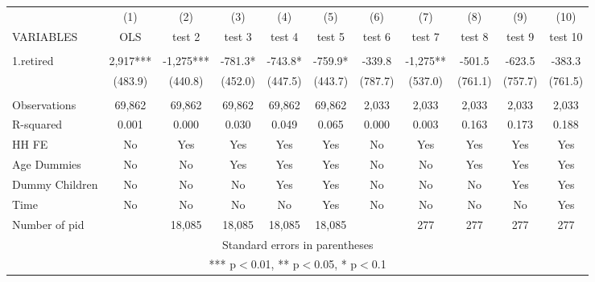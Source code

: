 \begin{tabular}{lcccccccccc} \hline
 & (1) & (2) & (3) & (4) & (5) & (6) & (7) & (8) & (9) & (10) \\
VARIABLES & OLS & test 2 & test 3 & test 4 & test 5 & test 6 & test 7 & test 8 & test 9 & test 10 \\ \hline
 &  &  &  &  &  &  &  &  &  &  \\
1.retired & 2,917*** & -1,275*** & -781.3* & -743.8* & -759.9* & -339.8 & -1,275** & -501.5 & -623.5 & -383.3 \\
 & (483.9) & (440.8) & (452.0) & (447.5) & (443.7) & (787.7) & (537.0) & (761.1) & (757.7) & (761.5) \\
 &  &  &  &  &  &  &  &  &  &  \\
Observations & 69,862 & 69,862 & 69,862 & 69,862 & 69,862 & 2,033 & 2,033 & 2,033 & 2,033 & 2,033 \\
R-squared & 0.001 & 0.000 & 0.030 & 0.049 & 0.065 & 0.000 & 0.003 & 0.163 & 0.173 & 0.188 \\
HH FE & No & Yes & Yes & Yes & Yes & No & Yes & Yes & Yes & Yes \\
Age Dummies & No & No & Yes & Yes & Yes & No & No & Yes & Yes & Yes \\
Dummy Children & No & No & No & Yes & Yes & No & No & No & Yes & Yes \\
Time & No & No & No & No & Yes & No & No & No & No & Yes \\
 Number of pid &  & 18,085 & 18,085 & 18,085 & 18,085 &  & 277 & 277 & 277 & 277 \\ \hline
\multicolumn{11}{c}{ Standard errors in parentheses} \\
\multicolumn{11}{c}{ *** p$<$0.01, ** p$<$0.05, * p$<$0.1} \\
\end{tabular}
